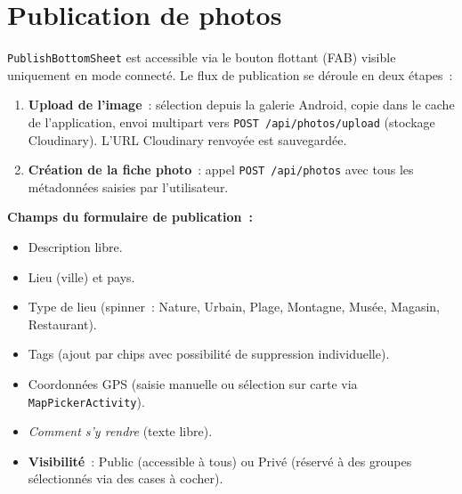 \documentclass[12pt, a4paper]{report}
\begin{document}
\section{Publication de photos}

\texttt{PublishBottomSheet} est accessible via le bouton flottant (FAB) visible uniquement
en mode connecté. Le flux de publication se déroule en deux étapes~:

\begin{enumerate}
  \item \textbf{Upload de l'image}~: sélection depuis la galerie Android, copie dans le
        cache de l'application, envoi multipart vers \texttt{POST /api/photos/upload}
        (stockage Cloudinary). L'URL Cloudinary renvoyée est sauvegardée.
  \item \textbf{Création de la fiche photo}~: appel \texttt{POST /api/photos} avec tous
        les métadonnées saisies par l'utilisateur.
\end{enumerate}

\textbf{Champs du formulaire de publication~:}
\begin{itemize}
  \item Description libre.
  \item Lieu (ville) et pays.
  \item Type de lieu (spinner~: Nature, Urbain, Plage, Montagne, Musée, Magasin, Restaurant).
  \item Tags (ajout par chips avec possibilité de suppression individuelle).
  \item Coordonnées GPS (saisie manuelle ou sélection sur carte via \texttt{MapPickerActivity}).
  \item \emph{Comment s'y rendre} (texte libre).
  \item \textbf{Visibilité}~: Public (accessible à tous) ou Privé (réservé à des groupes
        sélectionnés via des cases à cocher).
\end{itemize}
\end{document}
